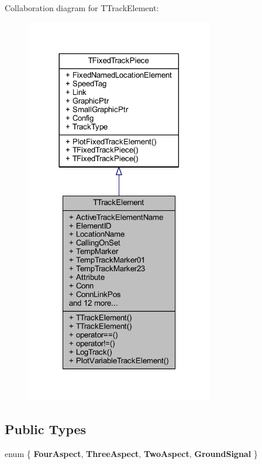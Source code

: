 Collaboration diagram for T\+Track\+Element\+:\nopagebreak
\begin{figure}[H]
\begin{center}
\leavevmode
\includegraphics[width=233pt]{class_t_track_element__coll__graph}
\end{center}
\end{figure}
\subsection*{Public Types}
\begin{DoxyCompactItemize}
\item 
\mbox{\label{class_t_track_element_abbbcaeb3e062e962d53337965d4fcaad}} 
enum \{ {\bfseries Four\+Aspect}, 
{\bfseries Three\+Aspect}, 
{\bfseries Two\+Aspect}, 
{\bfseries Ground\+Signal}
 \}
\end{DoxyCompactItemize}
